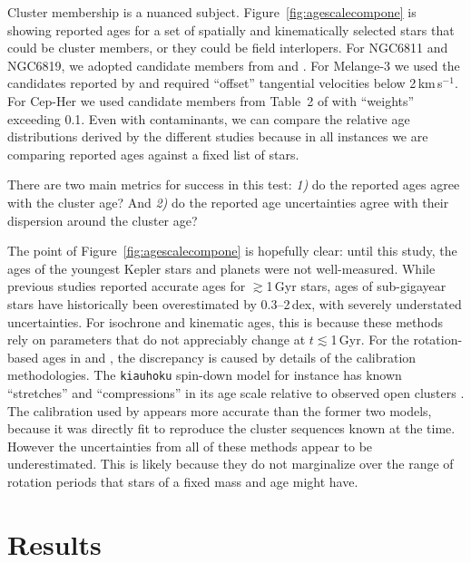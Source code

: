 \documentclass[11pt,twocolumn,tighten]{aastex63}
\newcommand{\kms}{{km\,s$^{-1}$}}
\begin{document}
Cluster membership is a nuanced subject.
Figure~\ref{fig:agescalecompone} is showing reported ages for a set of
spatially and kinematically selected stars that could be
cluster members, or they could be field interlopers.  For NGC6811 and
NGC6819, we adopted candidate members from
\citet{2018A&A...618A..93C,CantatGaudin_2020} and
\citet{Kounkel_2020}.  For Melange-3 we used the candidates reported
by \citet{Barber_2022} and required ``offset'' tangential velocities
below 2\,\kms.  For Cep-Her we used candidate members from Table~2 of
\citet{Bouma_2022b} with ``weights'' exceeding 0.1.  Even with
contaminants, we can compare the relative age distributions derived by
the different studies because in all instances we are comparing
reported ages against a fixed list of stars.

There are two main metrics for success in this test: {\it 1)}
do the reported ages agree with the cluster age? And {\it 2)} do the
reported age uncertainties agree with their dispersion
around the cluster age?

The point of Figure~\ref{fig:agescalecompone} is hopefully clear:
until this study, the ages of the youngest Kepler stars and planets were not 
well-measured.
While previous studies reported accurate ages for
$\gtrsim$1\,Gyr stars, ages of sub-gigayear stars have historically been
overestimated by 0.3--2\,dex, with severely understated uncertainties.  
For isochrone and kinematic ages, this is because these
methods rely on parameters that do not appreciably change at
$t$$\lesssim$1\,Gyr.  For the rotation-based ages in
\citet{2023ApJ...952..131M} and \citet{2024AJ....167..159L}, the
discrepancy is
caused by details of the calibration methodologies.  The
\texttt{kiauhoku} spin-down model for instance has known
``stretches'' and ``compressions'' in its age scale relative to observed open clusters
\citep[see][Sec. 7.3]{2023ApJ...952..131M}.
The \citet{Mamajek_2008}
calibration used by \citet{Reinhold_2015} appears more accurate than the former
two models, because it 
was directly fit to reproduce the cluster sequences known at the time.  However the
uncertainties from all of these methods appear to be underestimated.  This
is likely because
they do not marginalize over
the range of rotation periods that stars of a fixed
mass and age might have.



\section{Results}
\label{sec:results}
\end{document}
